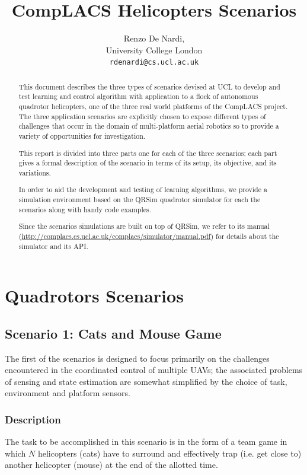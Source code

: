 \documentclass[a4paper,11pt]{report}
\title{{CompLACS} Helicopters Scenarios}
\author{Renzo De Nardi,\\University College London\\\texttt{rdenardi@cs.ucl.ac.uk}}
\newcommand{\sname}{QRSim\xspace}
\newcommand{\webman}{\url{http://complacs.cs.ucl.ac.uk/complacs/simulator/manual.pdf}\xspace}
\begin{document}
\maketitle



\begin{abstract}
This document describes the three types of scenarios devised at UCL to develop and test learning and control algorithm with application to a flock of autonomous quadrotor helicopters, one of the three real world platforms of the {CompLACS} project.
The three application scenarios are explicitly chosen to expose different types of challenges that occur in the domain of multi-platform aerial robotics so to provide a variety of opportunities for investigation.

This report is divided into three parts one for each of the three scenarios; each part gives a formal description of the scenario in terms of its setup, its objective, and its variations. 

In order to aid the development and testing of learning algorithms, we provide a simulation environment based on the \sname quadrotor simulator for each the scenarios along with handy code examples.

Since the scenarios simulations are built on top of \sname, we refer to its manual (\webman) for details about the simulator and its API.

\end{abstract}

\tableofcontents

\chapter{Quadrotors Scenarios}

\section{Scenario 1: Cats and Mouse Game}

The first of the scenarios is designed to focus primarily on the challenges encountered in the coordinated control of multiple UAVs; the associated problems of sensing and state estimation are somewhat simplified by the choice of task, environment and platform sensors. 

\subsection{Description}
The task to be accomplished in this scenario is in the form of a team game in which $N$ helicopters (cats) have to surround and effectively trap (i.e. get close to) another helicopter (mouse) at the end of the allotted time. 
\end{document}
